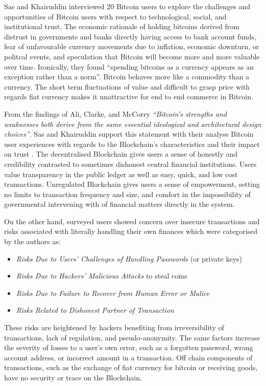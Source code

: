 \documentclass[12pt]{article} %
\begin{document}
Sas and Khairuddin interviewed 20 Bitcoin users to explore the challenges and opportunities of Bitcoin users with respect to technological, social, and institutional trust\cite{sas2016design}. The economic rationale of holding bitcoins derived from distrust in governments and banks directly having access to bank account funds, fear of unfavourable currency movements due to inflation, economic downturn, or politcal events, and speculation that Bitcoin will become more and more valuable over time. Ironically, they found ``spending bitcoins as a currency appears as an exception rather than a norm''. Bitcoin behaves more like a commodity than a currency. The short term fluctuations of value and difficult to grasp price with regards fiat currency makes it unattractive for end to end commerce in Bitcoin.

From the findings of Ali, Clarke, and McCorry \textit{``Bitcoin’s strengths and weaknesses both derive from the same essential ideological and architectural design choices''}\cite{Ali:2015:BPU:2990603.2990632}. Sas and Khairuddin support this statement with their analyse Bitcoin user experiences with regards to the Blockchain's characteristics and their impact on trust \cite{sas2016design}. The decentralised Blockchain gives users a sense of honestly and credibility contrasted to sometimes dishonest central financial institutions. Users value transparency in the public ledger as well as easy, quick, and low cost transactions. Unregulated Blockchain gives users a sense of empowerment, setting no limits to transaction frequency and size, and comfort in the impossibility of governmental intervening with of financial matters directly in the system.

On the other hand, surveyed users showed concern over insecure transactions and risks associated with literally handling their own finances which were categorised by the authors as:
\begin{itemize}
	\item \textit{Risks Due to Users' Challenges of Handling Passwords} (or private keys)
	\item \textit{Risks Due to Hackers' Malicious Attacks} to steal coins
	\item \textit{Risks Due to Failure to Recover from Human Error or Malice}
	\item \textit{Risks Related to Dishonest Partner of Transaction}
\end{itemize}
These risks are heightened by hackers benefiting from irreversibility of transactions, lack of regulation, and pseudo-anonymity. The same factors increase the severity of losses to a user's own error, such as a forgotten password, wrong account address, or incorrect amount in a transaction. Off chain components of transactions, such as the exchange of fiat currency for bitcoin or receiving goods, have no security or trace on the Blockchain.
\end{document}
